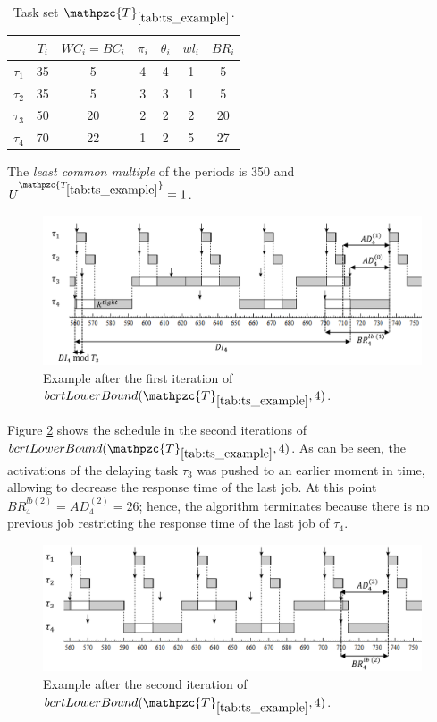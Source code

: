 \documentclass[fleqn]{article}
\begin{document}
\begin{table}[H]
	\center
	\caption{Task set $\mathpzc{T}_{\ref{tab:ts_example}}$.}
	\label{tab:ts_example}
	\begin{tabular}{c c c c c | c c}
		\hline 
		& $T_i$ & $WC_i=BC_i$ & $\pi_i$ & $\theta_i$ &  $wl_i$ & $BR_i$\\ 
		\hline 
		$\tau_1$& 35 & 5  & 4 & 4 &  1 & 5\\ 
		$\tau_2$& 35 & 5  & 3 & 3 &  1 & 5\\ 
		$\tau_3$& 50 & 20 & 2 & 2 &  2 & 20\\ 
		$\tau_4$& 70 & 22 & 1 & 2 &  5 & 27\\
		\hline 
	\end{tabular}
	\small
	\item The \textit{least common multiple} of the periods is 350 and $U^{\mathpzc{T_{\ref{tab:ts_example}}}}=1$.
\end{table}

\begin{figure}[H]
	\centering
	\includegraphics[width=1\linewidth]{figures/bcrt_lb_ex1.PNG}
	\caption{Example after the first iteration of $bcrtLowerBound(\mathpzc{T}_{\ref{tab:ts_example}},4)$. }
	\label{fig:bcrt_lb_ex1}
\end{figure}

Figure \ref{fig:bcrt_lb_ex2} shows the schedule in the second iterations of $bcrtLowerBound(\mathpzc{T}_{\ref{tab:ts_example}},4)$. As can be seen, the activations of the delaying task $\tau_3$ was pushed to an earlier moment in time, allowing to decrease the response time of the last job. At this point $BR^{lb(2)}_4 = AD^{(2)}_4 = 26$; hence, the algorithm terminates because there is no previous job restricting the response time of the last job of $\tau_4$.

\begin{figure}[H]
	\centering
	\includegraphics[width=1\linewidth]{figures/bcrt_lb_ex2.PNG}
	\caption{Example after the second iteration of $bcrtLowerBound(\mathpzc{T}_{\ref{tab:ts_example}},4)$. }
	\label{fig:bcrt_lb_ex2}
\end{figure}
\end{document}
